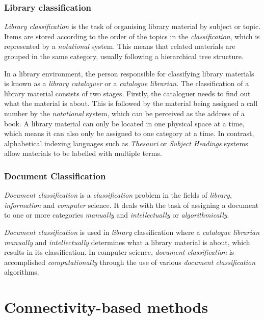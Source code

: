 \subsubsection{Library classification}

\textit{Library classification} is the task of organising library material by subject or topic. Items are stored according to the order of the topics in the \textit{classification}, which is represented by a \textit{notational} system. This means that related materials are grouped in the same category, usually following a hierarchical tree structure.

In a library environment, the person responsible for classifying library materials is known as a \textit{library cataloguer} or a \textit{catalogue librarian}. The classification of a library material consists of two stages. Firstly, the cataloguer needs to find out what the material is about. This is followed by the material being assigned a call number by the \textit{notational} system, which can be perceived as the address of a book. A library material can only be located in one physical space at a time, which means it can also only be assigned to one category at a time. In contrast, alphabetical indexing languages such as \textit{Thesauri} or \textit{Subject Headings} systems allow materials to be labelled with multiple terms.

\subsubsection{Document Classification}

\textit{Document classification} is a \textit{classification} problem in the fields of \textit{library}, \textit{information} and \textit{computer} science. It deals with the task of assigning a document to one or more categories \textit{manually} and \textit{intellectually} or \textit{algorithmically}.

\textit{Document classification} is used in \textit{library} classification where a \textit{catalogue librarian} \textit{manually} and \textit{intellectually} determines what a library material is about, which results in its classification. In computer science, \textit{document classification} is accomplished \textit{computationally} through the use of various \textit{document classification} algorithms.

\section{Connectivity-based methods}

